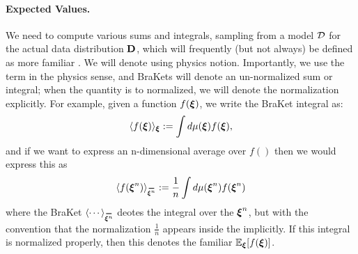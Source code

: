 \paragraph{Expected Values.}

We need to compute various sums and integrals, 
sampling from a model $\mathcal{D}$ for the actual data distribution $\mathbf{D}$,
which will frequently (but not always) be defined as more familiar \ExpectedValues.
We will denote \ExpectedValues using physics \BraKet notion.
Importantly, we use the term \ExpectedValue in the physics sense, and BraKets will denote an un-normalized sum or integral;
when the quantity is to normalized, we will denote the normalization explicitly.
For example, given a function $f(\boldsymbol{\xi})$, 
we write the BraKet integral as:
\begin{align}
 \label{eqn:EuT}
 \langle f(\boldsymbol{\xi}) \rangle_{\boldsymbol{\xi}}:=\int d\mu(\boldsymbol{\xi}) f(\boldsymbol{\xi})  ,
\end{align}
and if we want to express an n-dimensional average over $f()$ then we would express this as 
\begin{align}
    \label{eqn:EuT_normalized}
    \langle f(\NDXIn) \rangle_{\AVGNDXIn} := \frac{1}{n} \int d\mu(\NDXIn) f(\NDXIn)  
\end{align}
where the BraKet $\langle\cdots\rangle_{\AVGNDXIn}$ deotes the integral over the \ModelData $\boldsymbol{\xi}^{n}$, but with the convention that the normalization $\tfrac{1}{n}$
appears inside the \BraKet implicitly.
If this integral is normalized properly, then this denotes the familiar \ExpectedValue $\mathbb{E}_{\boldsymbol{\xi}}[f(\boldsymbol{\xi})]$.
